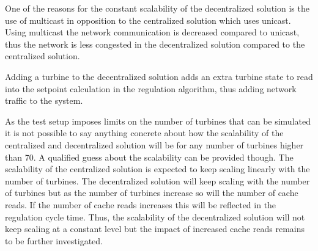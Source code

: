 One of the reasons for the constant scalability of the decentralized solution is the use of multicast in opposition to the centralized solution which uses unicast.
Using multicast the network communication is decreased compared to unicast, thus the network is less congested in the decentralized solution compared to the centralized solution.

Adding a turbine to the decentralized solution adds an extra turbine state to read into the setpoint calculation in the regulation algorithm, thus adding network traffic to the system.

As the test setup imposes limits on the number of turbines that can be simulated it is not possible to say anything concrete about how the scalability of the centralized and decentralized solution will be for any number of turbines higher than 70.
A qualified guess about the scalability can be provided though. The scalability of the centralized solution is expected to keep scaling linearly with the number of turbines. The decentralized solution will keep scaling with the number of turbines but as the number of turbines increase so will the number of cache reads. If the number of cache reads increases this will be reflected in the regulation cycle time. Thus, the scalability of the decentralized solution will not keep scaling at a constant level but the impact of increased cache reads remains to be further investigated.



\FloatBarrier


